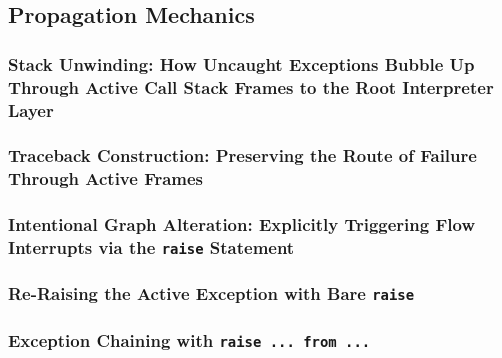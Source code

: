 \subsection{Propagation Mechanics}
\subsubsection{Stack Unwinding: How Uncaught Exceptions Bubble Up Through Active Call Stack Frames to the Root Interpreter Layer}
\subsubsection{Traceback Construction: Preserving the Route of Failure Through Active Frames}
\subsubsection{Intentional Graph Alteration: Explicitly Triggering Flow Interrupts via the \texttt{raise} Statement}
\subsubsection{Re-Raising the Active Exception with Bare \texttt{raise}}
\subsubsection{Exception Chaining with \texttt{raise ... from ...}}
